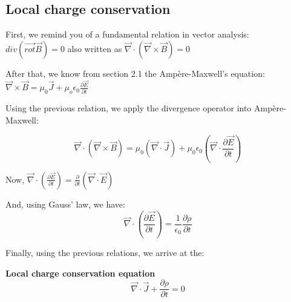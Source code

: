 \documentclass[11pt]{article}
\theoremstyle{definition}
\begin{document}
\subsection{Local charge conservation}
First, we remind you of a fundamental relation in vector analysis: $div\left(\vec{rot}\vec{B}\right) = 0$ also written as $\vec{\nabla} \cdot \left(\vec{\nabla} \times \vec{B}\right) = 0$

After that, we know from section 2.1 the Ampère-Maxwell's equation: $\vec{\nabla} \times \vec{B} = \mu_0 \vec{J} + \mu_o \epsilon_0 \frac{\partial \vec{E}}{\partial t}$

Using the previous relation, we apply the divergence operator into Ampère-Maxwell:

\begin{equation}
    \vec{\nabla} \cdot \left(\vec{\nabla} \times \vec{B}\right) = \mu_{0}\left(\vec{\nabla} \cdot \vec{J}\right) + \mu_{0} \epsilon_{0} \left(\vec{\nabla} \cdot \frac{\partial \vec{E}}{\partial t}\right)
\end{equation}

Now, $\vec{\nabla} \cdot \left(\frac{\partial \vec{E}}{\partial t}\right) = \frac{\partial}{\partial t}\left(\vec{\nabla} \cdot \vec{E}\right)$

And, using Gauss' law, we have:
\begin{equation}
    \vec{\nabla} \cdot \left(\frac{\partial \vec{E}}{\partial t}\right) = \frac{1}{\epsilon_{0}}\frac{\partial \rho}{\partial t}
\end{equation}

Finally, using the previous relations, we arrive at the:
\begin{shaded}
    \textbf{Local charge conservation equation}
    \begin{equation}
        \vec{\nabla} \cdot \vec{J} + \frac{\partial \rho}{\partial t} = 0
    \end{equation}
\end{shaded}
\end{document}
